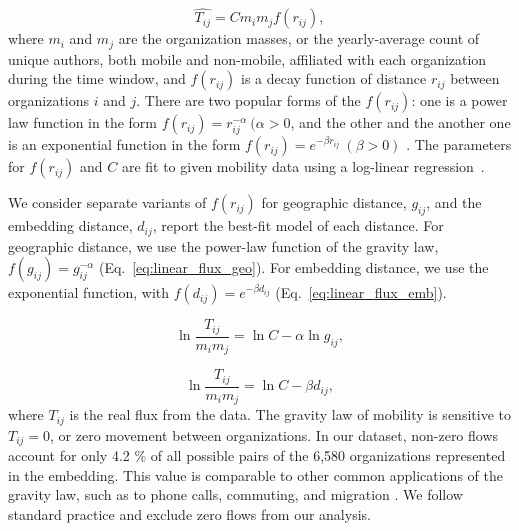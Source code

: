 \documentclass[12pt]{article} %
\begin{document}
%
%
\begin{equation}
	\label{eq:gravity_basic}
	\hat{T_{ij}} = Cm_{i}m_{j}f(r_{ij}),
\end{equation}
where $m_{i}$ and $m_{j}$ are the organization masses, or the yearly-average count of unique authors, both mobile and non-mobile, affiliated with each organization during the time window, and $f(r_{ij})$ is a decay function of distance $r_{ij}$ between organizations $i$ and $j$. 
There are two popular forms of the $f(r_{ij})$:
one is a power law function in the form $f(r_{ij})= r^{-\alpha}_{ij} \ (\alpha > 0$, and the other and the another one is an exponential function in the form $f(r_{ij}) = e^{-\beta r_{ij}} \ (\beta > 0)$ \autocite{chen2015distance}.  
The parameters for $f(r_{ij})$ and $C$ are fit to given mobility data using a log-linear regression~\autocite{jung2008highwaygravity, curiel2018citygravity, lewer2008immigrationgravity, xia2005measlesgravity, truscott2012epidemicgravity, hong2016busgravity, simini2012universal}.

We consider separate variants of $f(r_{ij})$ for geographic distance, $g_{ij}$, and the embedding distance, $d_{ij}$, report the best-fit model of each distance.
For geographic distance, we use the power-law function of the gravity law, $f(g_{ij})= g^{-\alpha}_{ij}$ (Eq.~\ref{eq:linear_flux_geo}).
For embedding distance, we use the exponential function, with $f(d_{ij}) = e^{-\beta d_{ij}}$ (Eq.~\ref{eq:linear_flux_emb}).

\begin{equation}
	\label{eq:linear_flux_geo}
	\ln\frac{T_{ij}}{m_im_j} = \ln C  - \alpha \ln g_{ij},
\end{equation}

\begin{equation}
	\label{eq:linear_flux_emb}
	\ln\frac{T_{ij}}{m_im_j} = \ln C - \beta d_{ij},
\end{equation}
where $T_{ij}$ is the real flux from the data. 
The gravity law of mobility is sensitive to $T_{ij} = 0$, or zero movement between organizations.
In our dataset, non-zero flows account for only 4.2 \% of all possible pairs of the 6,580 organizations represented in the embedding.
This value is comparable to other common applications of the gravity law, such as to phone calls, commuting, and migration \autocite{simini2012universal}.
We follow standard practice and exclude zero flows from our analysis.



%
%
\end{document}
